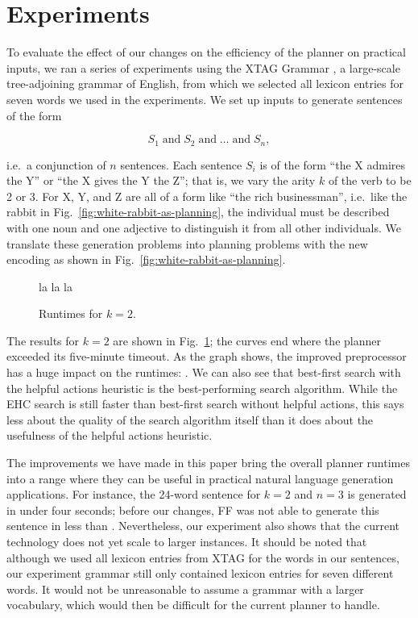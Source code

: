 \section{Experiments} 
\label{sec:experiments}

To evaluate the effect of our changes on the efficiency of the planner
on practical inputs, we ran a series of experiments using the XTAG
Grammar \cite{xtag01:_tr}, a large-scale tree-adjoining grammar of
English, from which we selected all lexicon entries for seven words we
used in the experiments. We set up inputs to generate sentences of the
form

$$S_1 \;\mathrm{and}\; S_2 \;\mathrm{and}\; \ldots \;\mathrm{and}\;
S_n,$$

i.e.\ a conjunction of $n$ sentences. Each sentence $S_i$ is of the
form ``the X admires the Y'' or ``the X gives the Y the Z''; that is,
we vary the arity $k$ of the verb to be 2 or 3. For X, Y, and Z are
all of a form like ``the rich businessman'', i.e.\ like the rabbit in
Fig.~\ref{fig:white-rabbit-as-planning}, the individual must be
described with one noun and one adjective to distinguish it from all
other individuals. We translate these generation problems into
planning problems with the new encoding as shown in
Fig.~\ref{fig:white-rabbit-as-planning}.

\begin{figure}
  \centering
  la la la
  \caption{Runtimes for $k=2$.}
  \label{fig:runtimes-k2}
\end{figure}

The results for $k=2$ are shown in Fig.~\ref{fig:runtimes-k2}; the
curves end where the planner exceeded its five-minute timeout.  As the
graph shows, the improved preprocessor has a huge impact on the
runtimes: .  We can also see that best-first
search with the helpful actions heuristic is the best-performing
search algorithm.  While the EHC search is still faster than
best-first search without helpful actions, this says less about the
quality of the search algorithm itself than it does about the
usefulness of the helpful actions heuristic.

The improvements we have made in this paper bring the overall planner
runtimes into a range where they can be useful in practical natural
language generation applications.  For instance, the 24-word sentence
for $k=2$ and $n=3$ is generated in under four seconds; before our
changes, FF was not able to generate this sentence in less than
.  Nevertheless, our experiment also shows that the
current technology does not yet scale to larger instances.  It should
be noted that although we used all lexicon entries from XTAG for the
words in our sentences, our experiment grammar still only contained
lexicon entries for seven different words.  It would not be
unreasonable to assume a grammar with a larger vocabulary, which would
then be difficult for the current planner to handle.


